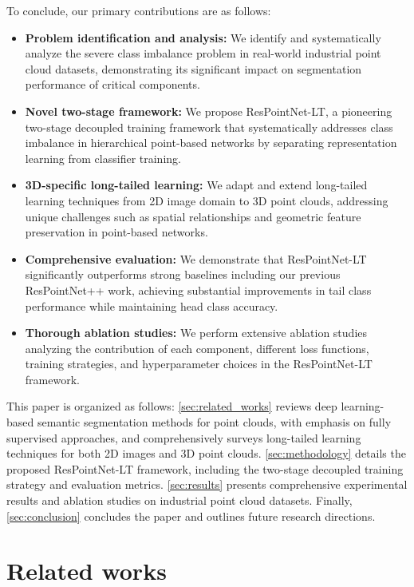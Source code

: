 \documentclass[preprint,12pt]{elsarticle}
\begin{document}
To conclude, our primary contributions are as follows:
\begin{itemize}
    \item \textbf{Problem identification and analysis:} We identify and systematically analyze the severe class imbalance problem in real-world industrial point cloud datasets, demonstrating its significant impact on segmentation performance of critical components.
    \item \textbf{Novel two-stage framework:} We propose ResPointNet-LT, a pioneering two-stage decoupled training framework that systematically addresses class imbalance in hierarchical point-based networks by separating representation learning from classifier training.
    \item \textbf{3D-specific long-tailed learning:} We adapt and extend long-tailed learning techniques from 2D image domain to 3D point clouds, addressing unique challenges such as spatial relationships and geometric feature preservation in point-based networks.
    \item \textbf{Comprehensive evaluation:} We demonstrate that ResPointNet-LT significantly outperforms strong baselines including our previous ResPointNet++ work, achieving substantial improvements in tail class performance while maintaining head class accuracy.
    \item \textbf{Thorough ablation studies:} We perform extensive ablation studies analyzing the contribution of each component, different loss functions, training strategies, and hyperparameter choices in the ResPointNet-LT framework.
\end{itemize}

This paper is organized as follows: \autoref{sec:related_works} reviews deep learning-based semantic segmentation methods for point clouds, with emphasis on fully supervised approaches, and comprehensively surveys long-tailed learning techniques for both 2D images and 3D point clouds. \autoref{sec:methodology} details the proposed ResPointNet-LT framework, including the two-stage decoupled training strategy and evaluation metrics. \autoref{sec:results} presents comprehensive experimental results and ablation studies on industrial point cloud datasets. Finally, \autoref{sec:conclusion} concludes the paper and outlines future research directions.

\section{Related works}
\label{sec:related_works}
\end{document}
